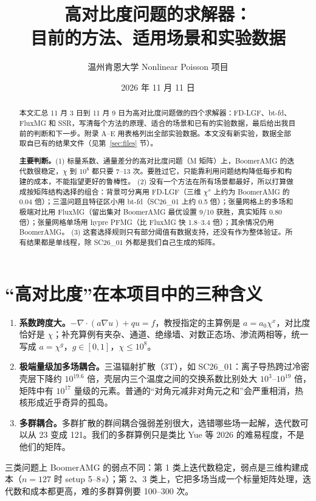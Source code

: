\documentclass[11pt,a4paper]{ctexart}
\title{高对比度问题的求解器：\\目前的方法、适用场景和实验数据}
\author{温州肯恩大学 \quad Nonlinear Poisson 项目}
\date{2026 年 11 月 11 日}
\begin{document}
\maketitle
\sloppy

\begin{abstract}
本文汇总 11 月 3 日到 11 月 9 日为高对比度问题做的四个求解器：FD-LGF、bt-fd、FluxMG 和 SSR，写清每个方法的原理、适合的场景和已有的实验数据，最后给出我目前的判断和下一步。附录 A--E 用表格列出全部实验数据。本文没有新实验，数据全部取自已有的结果文件（见第~\ref{sec:files} 节）。

\textbf{主要判断。}(1) 标量系数、通量差分的高对比度问题（M 矩阵）上，BoomerAMG 的迭代数很稳定，$\chi$ 到 $10^8$ 都只要 7--13 次。要胜过它，只能靠利用问题结构降低每步和构建的成本，不能指望更好的鲁棒性。
(2) 没有一个方法在所有场景都最好，所以打算做成按矩阵结构选择的组合：背景可分离用 FD-LGF（三维 $\chi^x$ 上约为 BoomerAMG 的 0.04 倍）；三温问题且特征区小用 bt-fd（SC26\_01 上约 0.5 倍）；张量网格上的多场和极端对比用 FluxMG（留出集对 BoomerAMG 最优设置 9/10 获胜，真实矩阵 0.80 倍）；张量网格单场用 hypre PFMG（比 FluxMG 快 1.8--3.4 倍）；其余情况仍用 BoomerAMG。
(3) 这套选择规则只有部分阈值有数据支持，还没有作为整体验证。所有结果都是单线程，除 SC26\_01 外都是我们自己生成的矩阵。
\end{abstract}

\tableofcontents

\section{“高对比度”在本项目中的三种含义}
\begin{enumerate}
\item \textbf{系数跨度大。}$-\nabla\cdot(a\nabla u)+qu=f$，教授指定的主算例是 $a=a_0\chi^x$，对比度恰好是 $\chi$；补充算例有夹杂、通道、绝缘墙、对数正态场、渗流两相等，统一写成 $a=\chi^{g}$，$g\in[0,1]$，$\chi\le10^8$。
\item \textbf{极端量级加多场耦合。}三温辐射扩散（3T），如 SC26\_01：离子导热跨过冷密壳层下降约 $10^{19.6}$ 倍，壳层内三个温度之间的交换系数比别处大 $10^3$--$10^{19}$ 倍，矩阵中有 $10^{17}$ 量级的元素。普通的“对角元减非对角元之和”会严重相消，热核形成近乎奇异的孤岛。
\item \textbf{多群耦合。}多群扩散的群间耦合强弱差别很大，选错哪些场一起解，迭代数可以从 23 变成 121。我们的多群算例只是类比 Yue 等 2026 的难易程度，不是他们的矩阵。
\end{enumerate}
三类问题上 BoomerAMG 的弱点不同：第 1 类上迭代数稳定，弱点是三维构建成本（$n=127$ 时 setup 5--8\,s）；第 2、3 类上，它把多场当成一个标量矩阵处理，迭代数和成本都更高，难的多群算例要 100--300 次。
\end{document}
